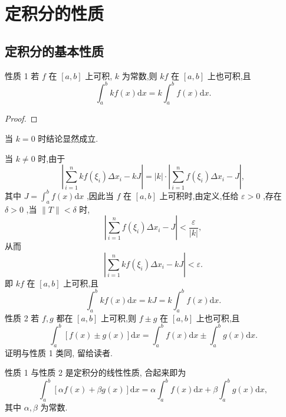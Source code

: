 \section{定积分的性质}

\subsection{定积分的基本性质}

性质 1 若 \(f\) 在 \(\left\lbrack  {a,b}\right\rbrack\) 上可积, \(k\) 为常数,则 \({kf}\) 在 \(\left\lbrack  {a,b}\right\rbrack\) 上也可积,且
\[
{\int }_{a}^{b}{kf}\left( x\right) \mathrm{d}x = k{\int }_{a}^{b}f\left( x\right) \mathrm{d}x. \tag{1}
\]
\begin{proof}

\end{proof}
当 \(k = 0\) 时结论显然成立.

当 \(k \neq  0\) 时,由于
\[
\left| {\mathop{\sum }\limits_{{i = 1}}^{n}{kf}\left( {\xi }_{i}\right) \Delta {x}_{i} - {kJ}}\right|  = \left| k\right|  \cdot  \left| {\mathop{\sum }\limits_{{i = 1}}^{n}f\left( {\xi }_{i}\right) \Delta {x}_{i} - J}\right| ,
\]
其中 \(J = {\int }_{a}^{b}f\left( x\right) \mathrm{d}x\) ,因此当 \(f\) 在 \(\left\lbrack  {a,b}\right\rbrack\) 上可积时,由定义,任给 \(\varepsilon  > 0\) ,存在 \(\delta  > 0\) ,当 \(\parallel T\parallel  < \delta\) 时,
\[
\left| {\mathop{\sum }\limits_{{i = 1}}^{n}f\left( {\xi }_{i}\right) \Delta {x}_{i} - J}\right|  < \frac{\varepsilon }{\left| k\right| },
\]
从而
\[
\left| {\mathop{\sum }\limits_{{i = 1}}^{n}{kf}\left( {\xi }_{i}\right) \Delta {x}_{i} - {kJ}}\right|  < \varepsilon .
\]
即 \({kf}\) 在 \(\left\lbrack  {a,b}\right\rbrack\) 上可积,且
\[
{\int }_{a}^{b}{kf}\left( x\right) \mathrm{d}x = {kJ} = k{\int }_{a}^{b}f\left( x\right) \mathrm{d}x.
\]
性质 2 若 \(f,g\) 都在 \(\left\lbrack  {a,b}\right\rbrack\) 上可积,则 \(f \pm  g\) 在 \(\left\lbrack  {a,b}\right\rbrack\) 上也可积,且
\[
{\int }_{a}^{b}\left\lbrack  {f\left( x\right)  \pm  g\left( x\right) }\right\rbrack  \mathrm{d}x = {\int }_{a}^{b}f\left( x\right) \mathrm{d}x \pm  {\int }_{a}^{b}g\left( x\right) \mathrm{d}x. \tag{2}
\]
证明与性质 1 类同, 留给读者.

性质 1 与性质 2 是定积分的线性性质, 合起来即为
\[
{\int }_{a}^{b}\left\lbrack  {{\alpha f}\left( x\right)  + {\beta g}\left( x\right) }\right\rbrack  \mathrm{d}x = \alpha {\int }_{a}^{b}f\left( x\right) \mathrm{d}x + \beta {\int }_{a}^{b}g\left( x\right) \mathrm{d}x,
\]
其中 \(\alpha ,\beta\) 为常数.

